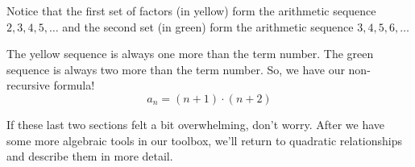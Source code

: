 \begin{boxedex}
Notice that the first set of factors (in yellow) form the arithmetic sequence $2, 3, 4, 5,\dotsc$ and the second set (in green) form the arithmetic sequence $3, 4, 5, 6,\ldots$

The yellow sequence is always one more than the term number. The green sequence is always two more than the term number. So, we have our non-recursive formula! \[a_n = (n+1)\cdot(n+2)\]
\end{boxedex}

If these last two sections felt a bit overwhelming, don't worry. After we have some more algebraic tools in our toolbox, we'll return to quadratic relationships and describe them in more detail.

%

%
%
%

